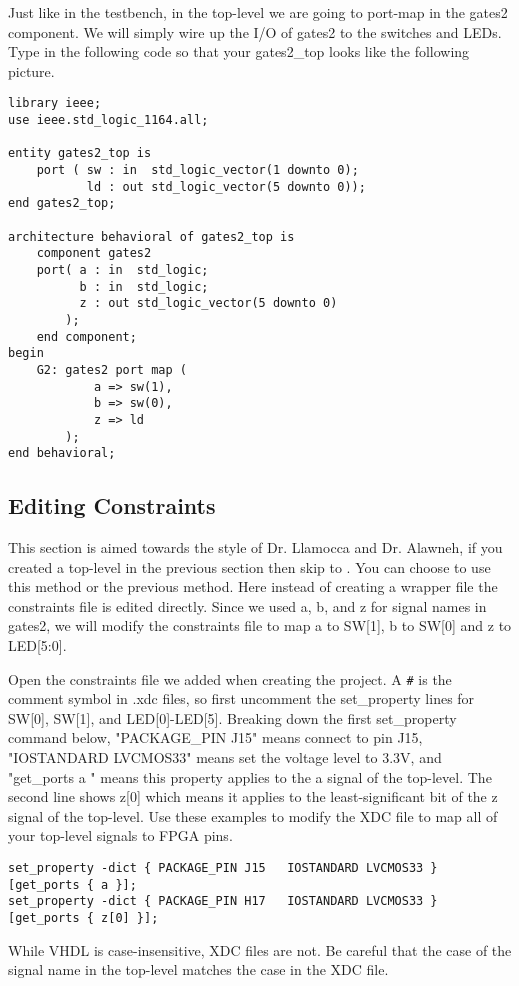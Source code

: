 Just like in the testbench, in the top-level we are going to port-map in the gates2 component.
We will simply wire up the I/O of gates2 to the switches and LEDs.
Type in the following code so that your gates2\_top looks like the following picture.

\begin{center}
\begin{minipage}{\textwidth}
\begin{verbatim}
library ieee;
use ieee.std_logic_1164.all;

entity gates2_top is
    port ( sw : in  std_logic_vector(1 downto 0);
           ld : out std_logic_vector(5 downto 0));
end gates2_top;

architecture behavioral of gates2_top is
    component gates2
    port( a : in  std_logic;
          b : in  std_logic;
          z : out std_logic_vector(5 downto 0)
        );
    end component;
begin
    G2: gates2 port map (
            a => sw(1),
            b => sw(0),
            z => ld
        );
end behavioral;
\end{verbatim}
\end{minipage}
\end{center}

\subsection{Editing Constraints}
\label{sec:constraints}
This section is aimed towards the style of Dr. Llamocca and Dr. Alawneh, if you created a top-level in the
previous section then skip to .
You can choose to use this method or the previous  method.
Here instead of creating a wrapper file the constraints file is edited directly.
Since we used a, b, and z for signal names in gates2, we will modify the constraints file to
map a to SW[1], b to SW[0] and z to LED[5:0].

Open the constraints file we added when creating the project.
A \verb|#| is the comment symbol in .xdc files, so first uncomment the set\_property lines
for SW[0], SW[1], and LED[0]-LED[5].
Breaking down the first set\_property command below, "PACKAGE\_PIN J15" means connect to pin
J15, "IOSTANDARD LVCMOS33" means set the voltage level to 3.3V, and "get\_ports { a }" means
this property applies to the a signal of the top-level.
The second line shows z[0] which means it applies to the least-significant bit of the z signal of
the top-level.
Use these examples to modify the XDC file to map all of your top-level signals to FPGA pins.

\begin{verbatim}
set_property -dict { PACKAGE_PIN J15   IOSTANDARD LVCMOS33 } [get_ports { a }];
set_property -dict { PACKAGE_PIN H17   IOSTANDARD LVCMOS33 } [get_ports { z[0] }];
\end{verbatim}

\begin{mdframed}[style=note]
    While VHDL is case-insensitive, XDC files are not.
    Be careful that the case of the signal name in the top-level matches the case in the XDC file.
\end{mdframed}
